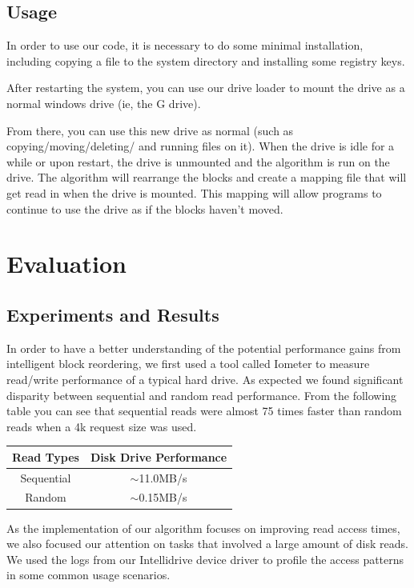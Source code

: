\documentclass[letterpaper,twocolumn,10pt]{article}
\begin{document}
\subsection{Usage}
In order to use our code, it is necessary to do some minimal installation, including copying a file to the system directory and installing some registry keys.

After restarting the system, you can use our drive loader to mount the drive as a normal windows drive (ie, the G drive).

From there, you can use this new drive as normal (such as copying/moving/deleting/ and running files on it).  When the drive is idle for a while or upon restart, the drive is unmounted and the algorithm is run on the drive.  The algorithm will rearrange the blocks and create a mapping file that will get read in when the drive is mounted.  This mapping will allow programs to continue to use the drive as if the blocks haven't moved.

\section{Evaluation}
\subsection{Experiments and Results}
In order to have a better understanding of the potential performance gains from intelligent block reordering, we first used a tool called Iometer to measure read/write performance of a typical hard drive. As expected we found significant disparity between sequential and random read performance.  From the following table you can see that sequential reads were almost 75 times faster than random reads when a 4k request size was used.
 
\begin{center}
  \begin{tabular}{ | c | c | }
    \hline
    \textbf{Read Types} & \textbf{Disk Drive Performance} \\ \hline
    Sequential & $\sim$11.0MB/s \\ 
    Random & $\sim$0.15MB/s \\
    \hline
  \end{tabular}
\end{center}

As the implementation of our algorithm focuses on improving read access times, we also focused our attention on tasks that involved a large amount of disk reads.  We used the logs from our Intellidrive device driver to profile the access patterns in some common usage scenarios. 
\end{document}
